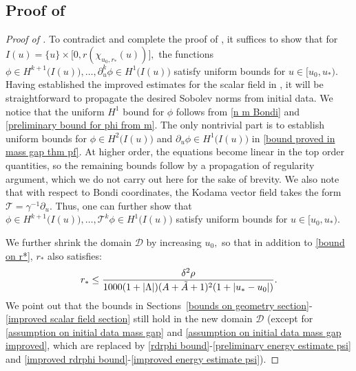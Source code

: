 \documentclass[11pt]{article}
\numberwithin{equation}{section}
\begin{document}
\subsection{Proof of }\label{proof of mass gap section}
\begin{proof}[Proof of ]
    To contradict  and complete the proof of , it suffices to show that for $I(u)=\{u\}\times\big[0,r(\chi_{u_0,r_*}(u))\big],$ the functions $\phi\in H^{k+1}\big(I(u)\big),\ldots,\partial_u^{k}\phi\in H^1\big(I(u)\big)$ satisfy uniform bounds for $u\in[u_0,u_*).$ Having established the improved estimates for the scalar field in , it will be straightforward to propagate the desired Sobolev norms from initial data. We notice that the uniform $H^1$ bound for $\phi$ follows from \eqref{n m Bondi} and \eqref{preliminary bound for phi from m}. The only nontrivial part is to establish uniform bounds for $\phi\in H^{2}\big(I(u)\big)$ and $\partial_u\phi\in H^1\big(I(u)\big)$ in \eqref{bound proved in mass gap thm pf}. At higher order, the equations become linear in the top order quantities, so the remaining bounds follow by a propagation of regularity argument, which we do not carry out here for the sake of brevity. We also note that with respect to Bondi coordinates, the Kodama vector field takes the form $\mathcal{T}=\gamma^{-1}\partial_u.$ Thus, one can further show that $\phi\in H^{k+1}\big(I(u)\big),\ldots,\mathcal{T}^{k}\phi\in H^1\big(I(u)\big)$ satisfy uniform bounds for $u\in[u_0,u_*).$ 

    We further shrink the domain $\mathcal{D}$ by increasing $u_0,$ so that in addition to \eqref{bound on r*}, $r_*$ also satisfies:
    \begin{equation}\label{extra bound on r*}
    r_*\leq\frac{\delta^2\rho}{1000(1+|\Lambda|)(A+\Tilde{A}+1)^2(1+|u_*-u_0|)}.
    \end{equation}
    We point out that the bounds in Sections~\ref{bounds on geometry section}-\ref{improved scalar field section} still hold in the new domain $\mathcal{D}$ (except for \eqref{assumption on initial data mass gap} and \eqref{assumption on initial data mass gap improved}, which are replaced by \eqref{rdrphi bound}-\eqref{preliminary energy estimate psi} and \eqref{improved rdrphi bound}-\eqref{improved energy estimate psi}).


\end{proof}
\end{document}
